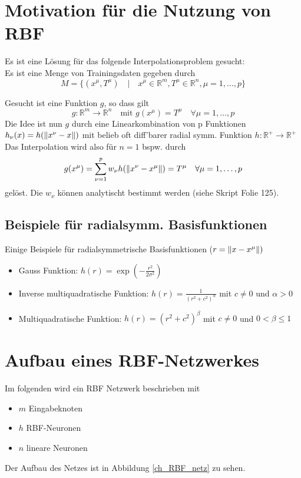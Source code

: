 \section{Motivation für die Nutzung von RBF}
Es ist eine Lösung für das folgende Interpolationsproblem gesucht:\\
Es ist eine Menge von Trainingsdaten gegeben durch
\begin{equation*}
    M = \{(x^\mu,T^\mu) \quad | \quad x^\mu \in \mathbb{R}^m, T^\mu \in \mathbb{R}^n,\mu=1,\dots,p\}
\end{equation*}

\noindent Gesucht ist eine Funktion $g$, so dass gilt
\begin{equation*}
    g: \mathbb{R}^m \to \mathbb{R}^n \quad \text{mit }g(x^\mu) = T^\mu \quad \forall \mu=1,\dots,p
\end{equation*}
\noindent Die Idee ist nun $g$ durch eine Linearkombination von p Funktionen $h_\nu(x) = h(\left\lVert x^\nu - x\right\rVert)$ mit belieb oft diff'barer radial symm. Funktion $h: \mathbb{R}^+ \to \mathbb{R}^+$\\
Das Interpolation wird also für $n=1$ bspw. durch
\begin{equation*}
    g(x^\mu)=\sum_{\nu=1}^p w_\nu h(\left\lVert x^\nu-x^\mu\right\rVert)=T^\mu \quad \forall \mu=1,\dots,p
\end{equation*}
gelöst. Die $w_\nu$ können analytischt bestimmt werden (siehe Skript Folie 125).

\subsection{Beispiele für radialsymm. Basisfunktionen}
Einige Beispiele für radialsymmetrische Basisfunktionen ($r=\left\lVert x-x^\mu\right\rVert)$
\begin{itemize}
    \item Gauss Funktion: $h(r) = \exp{(-\frac{r^2}{2\sigma^2})}$
    \item Inverse multiquadratische Funktion: $h(r) = \frac{1}{(r^2+c^2)^\alpha}$ mit $c\neq 0$ und $\alpha>0$
    \item Multiquadratische Funktion: $h(r) = (r^2+c^2)^\beta$ mit $c\neq0$ und $0<\beta\leq1$
\end{itemize}

\section{Aufbau eines RBF-Netzwerkes}
Im folgenden wird ein RBF Netzwerk beschrieben mit
\begin{itemize}
    \item $m$ Eingabeknoten
    \item $h$ RBF-Neuronen
    \item $n$ lineare Neuronen
\end{itemize}
Der Aufbau des Netzes ist in Abbildung \ref{ch_RBF_netz} zu sehen.

